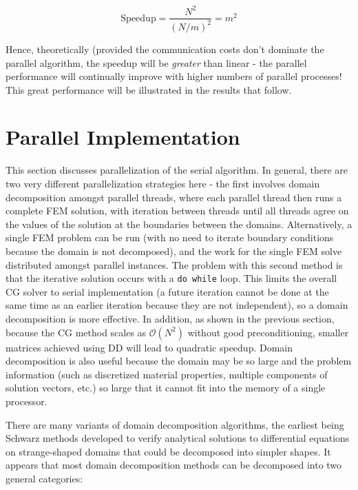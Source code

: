\documentclass[10pt]{article}
\newcommand{\beq}{\begin{equation}}
\newcommand{\eeq}{\end{equation}}
\begin{document}
\beq
\textrm{Speedup}=\frac{N^2}{(N/m)^2}=m^2
\eeq

Hence, theoretically (provided the communication costs don't dominate the parallel algorithm, the speedup will be {\it greater} than linear - the parallel performance will continually improve with higher numbers of parallel processes! This great performance will be illustrated in the results that follow. 






\section{Parallel Implementation}
This section discusses parallelization of the serial algorithm. In general, there are two very different parallelization strategies here - the first involves domain decomposition amongst parallel threads, where each parallel thread then runs a complete FEM solution, with iteration between threads until all threads agree on the values of the solution at the boundaries between the domains. Alternatively, a single FEM problem can be run (with no need to iterate boundary conditions because the domain is not decomposed), and the work for the single FEM solve distributed amongst parallel instances. The problem with this second method is that the iterative solution occurs with a {\tt do while} loop. This limits the overall CG solver to serial implementation (a future iteration cannot be done at the same time as an earlier iteration because they are not independent), so a domain decomposition is more effective. In addition, as shown in the previous section, because the CG method scales as \(\mathscr{O}(N^2)\) without good preconditioning, smaller matrices achieved using DD will lead to quadratic speedup. Domain decomposition is also useful because the domain may be so large and the problem information (such as discretized material properties, multiple components of solution vectors, etc.) so large that it cannot fit into the memory of a single processor. 

There are many variants of domain decomposition algorithms, the earliest being Schwarz methods developed to verify analytical solutions to differential equations on strange-shaped domains that could be decomposed into simpler shapes. It appears that most domain decomposition methods can be decomposed into two general categories:
\end{document}
